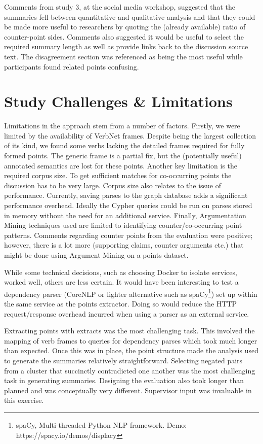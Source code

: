     Comments from study 3, at the social media workshop, suggested that the summaries fell between quantitative and qualitative analysis and that they could be made more useful to researchers by quoting the (already available) ratio of counter-point sides. Comments also suggested it would be useful to select the required summary length as well as provide links back to the discussion source text. The disagreement section was referenced as being the most useful while participants found related points confusing.

  \section{Study Challenges \& Limitations}
    Limitations in the approach stem from a number of factors. Firstly, we were limited by the availability of VerbNet frames. Despite being the largest collection of its kind, we found some verbs lacking the detailed frames required for fully formed points. The generic frame is a partial fix, but the (potentially useful) annotated semantics are lost for these points.
    Another key limitation is the required corpus size. To get sufficient matches for co-occurring points the discussion has to be very large. Corpus size also relates to the issue of performance. Currently, saving parses to the graph database adds a significant performance overhead. Ideally the Cypher queries could be run on parses stored in memory without the need for an additional service.
    Finally, Argumentation Mining techniques used are limited to identifying counter/co-occurring point patterns. Comments regarding counter points from the evaluation were positive; however, there is a lot more (supporting claims, counter arguments etc.) that might be done using Argument Mining on a points dataset.

    While some technical decisions, such as choosing Docker to isolate services, worked well, others are less certain. It would have been interesting to test a dependency parser (CoreNLP or lighter alternative such as spaCy\footnote{spaCy, Multi-threaded Python NLP framework. Demo: https://spacy.io/demos/displacy}) set up within the same service as the points extractor. Doing so would reduce the HTTP request/response overhead incurred when using a parser as an external service.

    Extracting points with extracts was the most challenging task. This involved the mapping of verb frames to queries for dependency parses which took much longer than expected. Once this was in place, the point structure made the analysis used to generate the summaries relatively straightforward. Selecting negated pairs from a cluster that succinctly contradicted one another was the most challenging task in generating summaries. Designing the evaluation also took longer than planned and was conceptually very different. Supervisor input was invaluable in this exercise.

